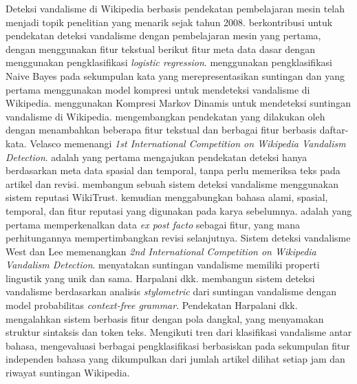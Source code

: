 Deteksi vandalisme di Wikipedia berbasis pendekatan pembelajaran mesin telah
menjadi topik penelitian yang menarik sejak tahun 2008.
\textcite{potthast2008automatic} berkontribusi untuk pendekatan deteksi
vandalisme dengan pembelajaran mesin yang pertama, dengan menggunakan fitur
tekstual berikut fitur meta data dasar dengan menggunakan pengklasifikasi
\textit{logistic regression}.
\textcite{smets08automaticvandalism} menggunakan pengklasifikasi Naive Bayes
pada sekumpulan kata yang merepresentasikan suntingan dan yang pertama
menggunakan model kompresi untuk mendeteksi vandalisme di Wikipedia.
\textcite{itakura2009using} menggunakan Kompresi Markov Dinamis
untuk mendeteksi suntingan vandalisme di Wikipedia.
\textcite{mola2012wikipedia} mengembangkan pendekatan yang dilakukan
oleh \textcite{potthast2008automatic} dengan menambahkan beberapa fitur
tekstual dan berbagai fitur berbasis daftar-kata.
Velasco memenangi \textit{1st International Competition on Wikipedia Vandalism
Detection}.
\textcite{west2011multilingual} adalah yang pertama
mengajukan pendekatan deteksi hanya berdasarkan meta data
spasial dan temporal, tanpa perlu memeriksa teks pada artikel dan revisi.
\textcite{adler2010detecting} membangun sebuah sistem deteksi vandalisme
menggunakan sistem reputasi WikiTrust.
\textcite{adler2011wikipedia} kemudian menggabungkan bahasa alami,
spasial, temporal, dan fitur reputasi yang digunakan pada karya sebelumnya.
\textcite{west2011multilingual} adalah yang pertama memperkenalkan
data \textit{ex post facto} sebagai fitur, yang mana perhitungannya
mempertimbangkan revisi selanjutnya.
Sistem deteksi vandalisme West dan Lee memenangkan \textit{2nd International
Competition on Wikipedia Vandalism Detection}.
\textcite{harpalani2011language} menyatakan suntingan vandalisme
memiliki properti lingustik yang unik dan sama.
Harpalani dkk. membangun sistem deteksi vandalisme berdasarkan analisis
\textit{stylometric} dari suntingan vandalisme dengan model probabilitas
\textit{context-free grammar}.
Pendekatan Harpalani dkk. mengalahkan sistem berbasis fitur dengan pola
dangkal, yang menyamakan struktur sintaksis dan token teks.
Mengikuti tren dari klasifikasi vandalisme antar bahasa,
\textcite{tran2013cross} mengevaluasi berbagai pengklasifikasi berbasiskan pada
sekumpulan fitur independen bahasa yang dikumpulkan dari jumlah artikel dilihat
setiap jam dan riwayat suntingan Wikipedia.

